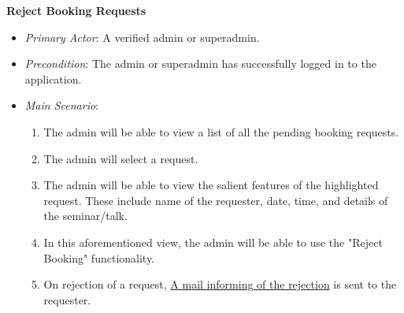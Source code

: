 \documentclass{article}
\begin{document}
\textbf{Reject Booking Requests}
\label{ucrejectbookingrequests}
\begin{itemize}
    \item \textit{Primary Actor}: A verified admin or superadmin. 
    \item \textit{Precondition}: The admin or superadmin has successfully logged in to the application. 
    \item \textit{Main Scenario}: 
    \begin{enumerate}
        \item The admin will be able to view a list of all the pending booking requests. 
        \item The admin will select a request. 
        \item The admin will be able to view the salient features of the highlighted request. These include name of the requester, date, time, and details of the seminar/talk. 
        \item In this aforementioned view, the admin will be able to use the "Reject Booking" functionality.
        \item On rejection of a request, \hyperref[ucbookingrejectionnotification]{A mail informing of the rejection} is sent to the requester.
    \end{enumerate}
\end{itemize}
\end{document}
